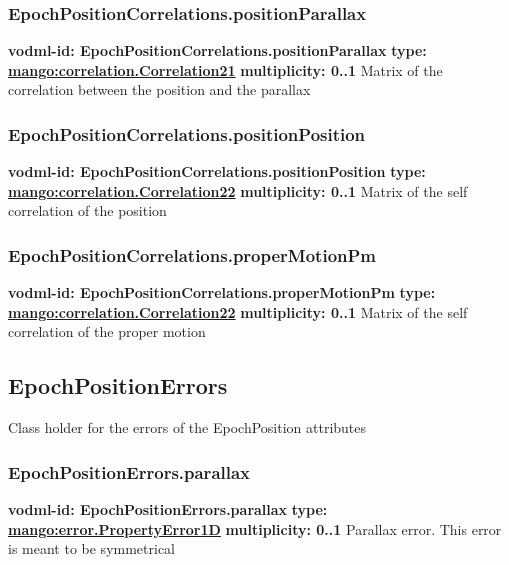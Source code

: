     \subsubsection{EpochPositionCorrelations.positionParallax}
      \textbf{vodml-id: EpochPositionCorrelations.positionParallax} \newline
      \textbf{type: \hyperref[sect:correlation.Correlation21]{mango:correlation.Correlation21}} \newline
      \textbf{multiplicity: 0..1} \newline 
      Matrix of the correlation between the position and the parallax

    \subsubsection{EpochPositionCorrelations.positionPosition}
      \textbf{vodml-id: EpochPositionCorrelations.positionPosition} \newline
      \textbf{type: \hyperref[sect:correlation.Correlation22]{mango:correlation.Correlation22}} \newline
      \textbf{multiplicity: 0..1} \newline 
      Matrix of the self correlation of the position

    \subsubsection{EpochPositionCorrelations.properMotionPm}
      \textbf{vodml-id: EpochPositionCorrelations.properMotionPm} \newline
      \textbf{type: \hyperref[sect:correlation.Correlation22]{mango:correlation.Correlation22}} \newline
      \textbf{multiplicity: 0..1} \newline 
      Matrix of the self correlation of the proper motion

  \subsection{EpochPositionErrors}
  \label{sect:EpochPositionErrors}
    Class holder for the errors of the EpochPosition attributes

    \subsubsection{EpochPositionErrors.parallax}
      \textbf{vodml-id: EpochPositionErrors.parallax} \newline
      \textbf{type: \hyperref[sect:error.PropertyError1D]{mango:error.PropertyError1D}} \newline
      \textbf{multiplicity: 0..1} \newline 
      Parallax error. This error is meant to be symmetrical


